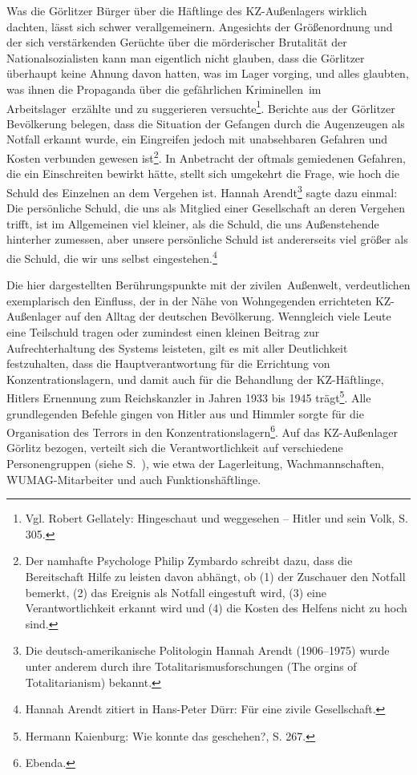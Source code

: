 Was die Görlitzer Bürger über die Häftlinge des KZ-Außenlagers wirklich dachten, lässt sich schwer verallgemeinern.
Angesichts der Größenordnung und der sich verstärkenden Gerüchte über die mörderischer Brutalität der Nationalsozialisten kann man eigentlich nicht glauben, dass die Görlitzer überhaupt keine Ahnung davon hatten, was im Lager vorging, und alles glaubten, was ihnen die Propaganda über die \glqq gefährlichen Kriminellen\grqq~im \glqq Arbeitslager\grqq~erzählte und zu suggerieren versuchte\footnote{Vgl. Robert Gellately: Hingeschaut und weggesehen -- Hitler und sein Volk, S. 305.}. Berichte aus der Görlitzer Bevölkerung belegen, dass die Situation der Gefangen durch die Augenzeugen als Notfall erkannt wurde, ein Eingreifen jedoch mit unabsehbaren Gefahren und Kosten verbunden gewesen ist\footnote{Der namhafte Psychologe Philip Zymbardo schreibt dazu, dass die Bereitschaft Hilfe zu leisten davon abhängt, ob (1) der Zuschauer den Notfall bemerkt, (2) das Ereignis als Notfall eingestuft wird, (3) eine Verantwortlichkeit erkannt wird und (4) die Kosten des Helfens nicht zu hoch sind.}.
In Anbetracht der oftmals gemiedenen Gefahren, die ein Einschreiten bewirkt hätte, stellt sich umgekehrt die Frage, wie hoch die Schuld des Einzelnen an dem Vergehen ist. Hannah Arendt\footnote{Die deutsch-amerikanische Politologin Hannah Arendt (1906--1975) wurde unter anderem durch ihre Totalitarismusforschungen (\glqq The orgins of Totalitarianism\grqq) bekannt.} sagte dazu einmal:
 \glqq Die persönliche Schuld, die uns als Mitglied einer Gesellschaft an deren Vergehen trifft, ist im Allgemeinen viel kleiner, als die Schuld, die uns Außenstehende hinterher zumessen, aber unsere persönliche Schuld ist andererseits viel größer als die Schuld, die wir uns selbst eingestehen.\grqq\footnote{Hannah Arendt zitiert in Hans-Peter Dürr: \glqq Für eine zivile Gesellschaft\grqq.}

Die hier dargestellten Berührungspunkte mit der \glqq zivilen\grqq~Außenwelt, verdeutlichen exemplarisch den Einfluss, der in der Nähe von Wohngegenden errichteten KZ-Außenlager auf den Alltag der deutschen Bevölkerung.
Wenngleich viele Leute eine Teilschuld tragen oder zumindest einen kleinen Beitrag zur Aufrechterhaltung des Systems leisteten, gilt es mit aller Deutlichkeit festzuhalten, dass die Hauptverantwortung für die Errichtung von Konzentrationslagern, und damit auch für die Behandlung der KZ-Häftlinge, Hitlers Ernennung zum Reichskanzler in Jahren 1933 bis 1945 trägt\footnote{Hermann Kaienburg: Wie konnte das geschehen?, S. 267.}. Alle grundlegenden Befehle gingen von Hitler aus und Himmler sorgte für die Organisation des Terrors in den Konzentrationslagern\footnote{Ebenda.}. Auf das KZ-Außenlager Görlitz bezogen, verteilt sich die Verantwortlichkeit auf verschiedene Personengruppen (siehe S.~\pageref{ns-verbrechen}), wie etwa der Lagerleitung, Wachmannschaften, WUMAG-Mitarbeiter und auch Funktionshäftlinge.

